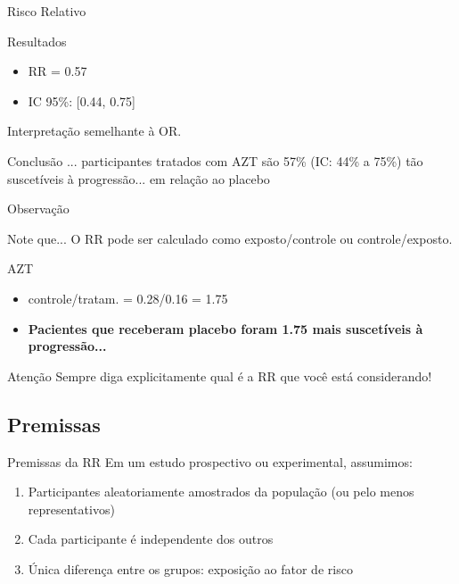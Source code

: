 \documentclass{beamer}
\begin{document}
\begin{frame}{\scriptsize Risco Relativo}
  \begin{exampleblock}{Resultados}
    \footnotesize
    \begin{itemize}
      \footnotesize
    \item RR = 0.57
    \item IC 95\%: [0.44, 0.75]
    \end{itemize}
  \end{exampleblock}

  \begin{center}
    Interpretação semelhante à OR.
  \end{center}

  \begin{exampleblock}{Conclusão}
    \footnotesize
    ... participantes tratados com AZT são 57\% (IC: 44\% a 75\%) tão suscetíveis à progressão... em relação ao placebo
  \end{exampleblock}
\end{frame}

\begin{frame}{\scriptsize Observação}
  \begin{block}{Note que...}
    \footnotesize
    O RR pode ser calculado como exposto/controle ou controle/exposto.
  \end{block}
  \begin{exampleblock}{AZT}
    \footnotesize
    \begin{itemize}
      \footnotesize
    \item controle/tratam. = 0.28/0.16 = 1.75
    \item {\bf Pacientes que receberam placebo foram 1.75 mais suscetíveis à progressão...}
    \end{itemize}
  \end{exampleblock}
  \begin{block}{Atenção}
    \footnotesize
    Sempre diga explicitamente qual é a RR que você está considerando!
  \end{block}
\end{frame}

\subsection{Premissas}

\begin{frame}{\scriptsize Premissas da RR}
  Em um estudo prospectivo ou experimental, assumimos:
  \begin{enumerate}
    \footnotesize
  \item Participantes aleatoriamente amostrados da população (ou pelo menos representativos)
  \item Cada participante é independente dos outros
  \item Única diferença entre os grupos: exposição ao fator de risco
  \end{enumerate}
\end{frame}
\end{document}
